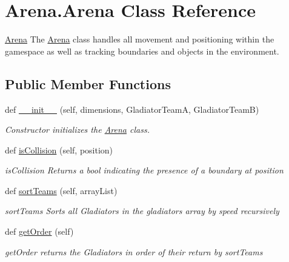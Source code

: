 \hypertarget{classArena_1_1Arena}{}\section{Arena.\+Arena Class Reference}
\label{classArena_1_1Arena}


\hyperlink{classArena_1_1Arena}{Arena} The \hyperlink{classArena_1_1Arena}{Arena} class handles all movement and positioning within the gamespace as well as tracking boundaries and objects in the environment.  


\subsection*{Public Member Functions}
\begin{DoxyCompactItemize}
\item 
def \hyperlink{classArena_1_1Arena_a86954a39b5b1ab78ebed13a4bee93179}{\+\_\+\+\_\+init\+\_\+\+\_\+} (self, dimensions, Gladiator\+Team\+A, Gladiator\+Team\+B)
\begin{DoxyCompactList}\small\item\em Constructor initializes the \hyperlink{classArena_1_1Arena}{Arena} class. \end{DoxyCompactList}\item 
def \hyperlink{classArena_1_1Arena_a52b533162634c7097fc101b0fafa906f}{is\+Collision} (self, position)
\begin{DoxyCompactList}\small\item\em is\+Collision Returns a bool indicating the presence of a boundary at position \end{DoxyCompactList}\item 
\hypertarget{classArena_1_1Arena_a43eacf485b84652c9034ead9912055c2}{}def \hyperlink{classArena_1_1Arena_a43eacf485b84652c9034ead9912055c2}{sort\+Teams} (self, array\+List)\label{classArena_1_1Arena_a43eacf485b84652c9034ead9912055c2}

\begin{DoxyCompactList}\small\item\em sort\+Teams Sorts all Gladiators in the gladiators array by speed recursively \end{DoxyCompactList}\item 
\hypertarget{classArena_1_1Arena_a46a2c71c532d69bde3a40a956c905068}{}def \hyperlink{classArena_1_1Arena_a46a2c71c532d69bde3a40a956c905068}{get\+Order} (self)\label{classArena_1_1Arena_a46a2c71c532d69bde3a40a956c905068}

\begin{DoxyCompactList}\small\item\em get\+Order returns the Gladiators in order of their return by sort\+Teams \end{DoxyCompactList}\end{DoxyCompactItemize}
